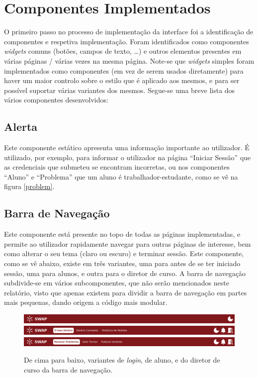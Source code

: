 \documentclass[12pt, a4paper]{article}
\begin{document}
\section{Componentes Implementados}

O primeiro passo no processo de implementação da interface foi a identificação de componentes e
respetiva implementação. Foram identificados como componentes \emph{widgets} comuns (botões, campos
de texto, \ldots) e outros elementos presentes em várias páginas / várias vezes na mesma página.
Note-se que \emph{widgets} simples foram implementados como componentes (em vez de serem usados
diretamente) para haver um maior controlo sobre o estilo que é aplicado aos mesmos, e para ser
possível suportar várias variantes dos mesmos. Segue-se uma breve lista dos vários componentes
desenvolvidos:

\subsection{Alerta}

Este componente estático apresenta uma informação importante ao utilizador. É utilizado, por
exemplo, para informar o utilizador na página ``Iniciar Sessão'' que as credenciais que submeteu
se encontram incorretas, ou nos componentes ``Aluno'' e ``Problema'' que um aluno é
trabalhador-estudante, como se vê na figura \ref{problem}.

\subsection{Barra de Navegação}

Este componente está presente no topo de todas as páginas implementadas, e permite ao utilizador
rapidamente navegar para outras páginas de interesse, bem como alterar o seu tema (claro ou escuro)
e terminar sessão. Este componente, como se vê abaixo, existe em três variantes, uma para antes de
se ter iniciado sessão, uma para alunos, e outra para o diretor de curso. A barra de navegação
subdivide-se em vários subcomponentes, que não serão mencionados neste relatório, visto que apenas
existem para dividir a barra de navegação em partes mais pequenas, dando origem a código mais
modular.

\begin{figure}[H]
    \centering
    \includegraphics[width=\textwidth]{res/components/navbar-login.png}
    \includegraphics[width=\textwidth]{res/components/navbar-student.png}
    \includegraphics[width=\textwidth]{res/components/navbar-director.png}
    \caption{
        \onehalfspacing
        De cima para baixo, variantes de \emph{login}, de aluno, e do diretor de curso da barra de
        navegação.
    }
    \label{navbar}
\end{figure}
\end{document}
